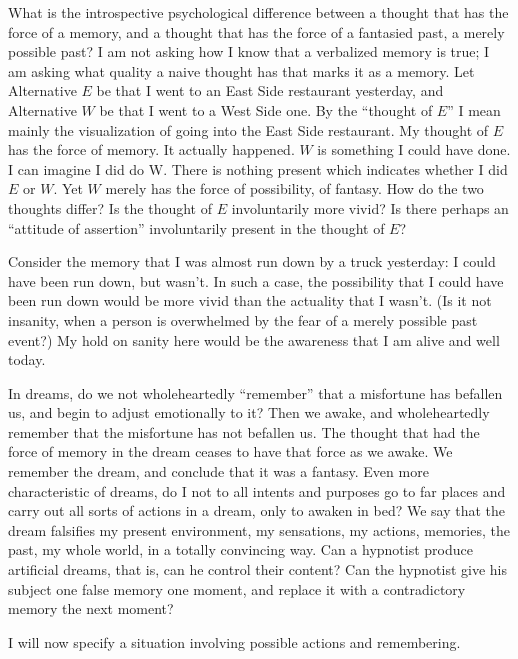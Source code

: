 What is the introspective psychological difference between a thought 
that has the force of a memory, and a thought that has the force of a 
fantasied past, a merely possible past? I am not asking how I know that a 
verbalized memory is true; I am asking what quality a naive thought has that 
marks it as a memory. Let Alternative $E$ be that I went to an East Side 
restaurant yesterday, and Alternative $W$ be that I went to a West Side one. 
By the \enquote{thought of $E$} I mean mainly the visualization of going into the East 
Side restaurant. My thought of $E$ has the force of memory. It actually 
happened. $W$ is something I could have done. I can imagine I did do W. There 
is nothing present which indicates whether I did $E$ or $W$. Yet $W$ merely has 
the force of possibility, of fantasy. How do the two thoughts differ? Is the 
thought of $E$ involuntarily more vivid? Is there perhaps an \enquote{attitude of 
assertion} involuntarily present in the thought of $E$? 

Consider the memory that I was almost run down by a truck yesterday: 
I could have been run down, but wasn't. In such a case, the possibility that I 
could have been run down would be more vivid than the actuality that I 
wasn't. (Is it not insanity, when a person is overwhelmed by the fear of a 
merely possible past event?) My hold on sanity here would be the awareness 
that I am alive and well today. 

In dreams, do we not wholeheartedly \enquote{remember} that a misfortune 
has befallen us, and begin to adjust emotionally to it? Then we awake, and 
wholeheartedly remember that the misfortune has not befallen us. The 
thought that had the force of memory in the dream ceases to have that force 
as we awake. We remember the dream, and conclude that it was a fantasy. 
Even more characteristic of dreams, do I not to all intents and purposes go 
to far places and carry out all sorts of actions in a dream, only to awaken in 
bed? We say that the dream falsifies my present environment, my 
sensations, my actions, memories, the past, my whole world, in a totally 
convincing way. Can a hypnotist produce artificial dreams, that is, can he 
control their content? Can the hypnotist give his subject one false memory 
one moment, and replace it with a contradictory memory the next 
moment? 

I will now specify a situation involving possible actions and 
remembering. 

\newenvironment{hangers}
{\vskip 0.5em\begin{hangparas}{3em}{1}}
{\end{hangparas}\vskip 0.5em}

